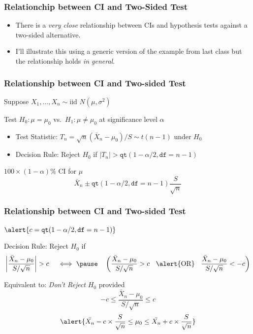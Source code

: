 \documentclass[handout]{beamer}
\begin{document}
\begin{frame}
	\frametitle{Relationchip between CI and Two-Sided Test}

	\begin{itemize}
		\item There is a \emph{very close} relationship between CIs and hypothesis tests against a two-sided alternative.
		\item I'll illustrate this using a generic version of the example from last class but the relationship holds \emph{in general}.
	\end{itemize}
\end{frame}
\begin{frame}
\frametitle{Relationship between CI and Two-sided Test}
Suppose $X_1, \hdots, X_n \sim \mbox{iid } N(\mu,\sigma^2)$

\vspace{1em}
	\begin{block}{Test $H_0\colon \mu = \mu_0$ vs.\ $H_1\colon \mu \neq \mu_0$ at significance level $\alpha$} 
		\begin{itemize}
			\item Test Statistic:  $T_n = \sqrt{n}(\bar{X}_n - \mu_0)/S \sim t(n-1)$ under $H_0$ 
			\item Decision Rule: Reject $H_0$ if $|T_n| > \texttt{qt}(1-\alpha/2, \texttt{df}=n-1)$ 
			\end{itemize}

			\pause
\end{block}
	\begin{block}{$100\times (1-\alpha)\%$ CI for $\mu$} 
		$$\bar{X}_n \pm \texttt{qt}(1-\alpha/2, \texttt{df}=n-1) \frac{S}{\sqrt{n}}$$
\end{block}
\end{frame}
\begin{frame}
\frametitle{Relationship between CI and Two-sided Test}
$\alert{c =  \texttt{qt}(1-\alpha/2, \texttt{df}=n-1)}$
\begin{block}{Decision Rule: Reject $H_0$ if}
		$$\left|\frac{\bar{X}_n - \mu_0}{S/\sqrt{n}} \right|> c \quad \iff \pause  \quad \left(\frac{\bar{X}_n - \mu_0}{S/\sqrt{n}}> c \;\;\mbox{  \alert{OR}  }\;\;\frac{\bar{X}_n - \mu_0}{S/\sqrt{n}}< - c\right)$$
\end{block}

\pause
\begin{block}{Equivalent to: \emph{Don't Reject} $H_0$ provided}
	$$-c \leq \frac{\bar{X}_n - \mu_0}{S/\sqrt{n}}\leq c $$ \pause
	$$\alert{\bar{X_n} - c\times \frac{S}{\sqrt{n}} \leq \mu_0 \leq \bar{X_n} + c\times \frac{S}{\sqrt{n}}}$$
\end{block}
\end{frame}
\end{document}

